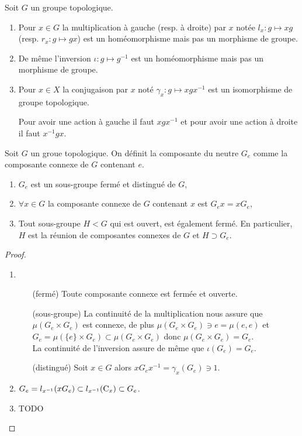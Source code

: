 \begin{prop}

Soit $G$ un groupe topologique.
\begin{enumerate}
 \item Pour $x\in G$ la multiplication à gauche (resp. à droite) par $x$ notée
$l_x : g\mapsto xg$ (resp. $r_x : g\mapsto gx$) est un homéomorphisme mais pas
un morphisme de groupe.
 \item De même l'inversion $\iota : g\mapsto g^{-1}$ est un homéomorphisme mais
pas un morphisme de groupe.
 \item Pour $x\in X$ la conjugaison par $x$ noté $\gamma_x : g\mapsto xgx^{-1}$
est un isomorphisme de groupe topologique.

Pour avoir une action à gauche il
faut $xgx^{-1}$ et pour avoir une action à droite il faut $x^{-1}gx$.
\end{enumerate}
\end{prop}

\begin{defi}

Soit $G$ un groue topologique. On définit la composante du neutre $G_e$ comme
la composante connexe de $G$ contenant $e$.
\end{defi}

\begin{prop}
 \begin{enumerate}
  \item $G_e$ est un sous-groupe fermé et distingué de $G$,
  \item $\forall x \in G$ la composante connexe de $G$ contenant $x$ est $G_ex =
xG_e$,
  \item Tout sous-groupe $H < G$ qui est ouvert, est également fermé. En
particulier, $H$ est la réunion de composantes connexes de $G$ et $H \supset
G_e$.
 \end{enumerate}
\end{prop}

\begin{proof} \
 \begin{enumerate}
  \item \begin{itemize}
    \item [(fermé)] Toute composante connexe est fermée et ouverte.
    \item [(sous-groupe)] La continuité de la multiplication nous assure
 que $\mu(G_e\times G_e)$ est connexe, de plus
$\mu(G_e\times G_e) \owns e = \mu(e,e)$ et $G_e = \mu(\{e\}\times G_e)\subset
\mu(G_e\times G_e)$ donc $\mu(G_e\times
G_e) = G_e$.\\
La continuité de l'inversion assure de même que
$\iota(G_e) = G_e$.
    \item [(distingué)] Soit $x\in G$ alors $xG_ex^{-1} =
\gamma_x(G_e)\owns 1$. 
\end{itemize}
\item $G_e = l_{x^{-1}}(xG_e) \subset l_{x^{-1}}(\operatorname{C}_x) \subset G_e$.
\item TODO
 \end{enumerate}
\end{proof}

